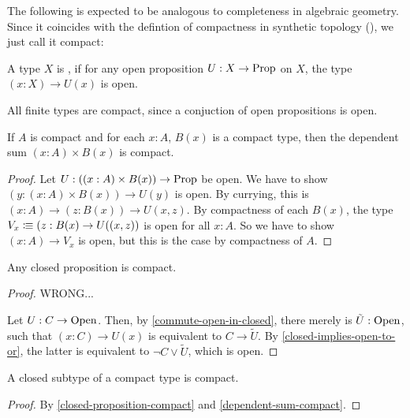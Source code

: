 
The following is expected to be analogous to completeness in algebraic geometry.
Since it coincides with the defintion of compactness in synthetic topology (\cite{MISSING}),
we just call it compact:

\begin{definition}
  A type $X$ is ,
  if for any open proposition $U:X\to\mathrm{Prop}$ on $X$,
  the type $(x:X)\to U(x)$ is open.
\end{definition}

\begin{example}
  All finite types are compact, since a conjuction of open propositions is open.
\end{example}

\begin{lemma}
  \label{dependent-sum-compact}
  If $A$ is compact and for each $x:A$, $B(x)$ is a compact type,
  then the dependent sum $(x:A)\times B(x)$ is compact.
\end{lemma}

\begin{proof}
  Let $U:((x:A)\times B(x))\to\mathrm{Prop}$ be open.
  We have to show $(y:(x:A)\times B(x))\to U(y)$ is open.
  By currying, this is $(x:A)\to (z:B(x))\to U(x,z)$.
  By compactness of each $B(x)$, the type $V_x\vcentcolon\mspace{-1.2mu}\equiv (z:B(x)\to U((x,z))$ is open for all $x:A$.
  So we have to show $(x:A)\to V_x$ is open, but this is the case by compactness of $A$.
\end{proof}

\begin{lemma}
  \label{closed-proposition-compact}
  Any closed proposition is compact.
\end{lemma}

\begin{proof}
  WRONG...
  
  Let $U:C\to\mathrm{Open}$.
  Then, by \cref{commute-open-in-closed}, there merely is $\tilde{U}:\mathrm{Open}$,
  such that $(x:C)\to U(x)$ is equivalent to $C\to\tilde{U}$.
  By \cref{closed-implies-open-to-or}, the latter is equivalent to $\neg C\vee \tilde{U}$,
  which is open.
\end{proof}

\begin{lemma}
  \label{closed-subtype-compact}
  A closed subtype of a compact type is compact.
\end{lemma}

\begin{proof}
  By \cref{closed-proposition-compact} and \cref{dependent-sum-compact}.
\end{proof}

